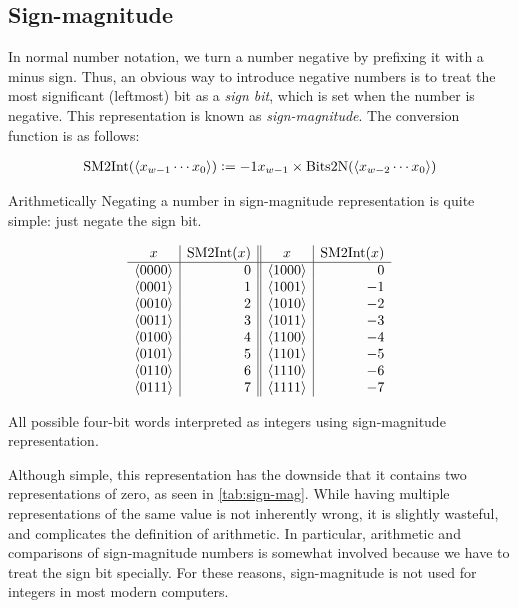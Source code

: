 \subsection{Sign-magnitude}
\label{sec:sign-magnitude}

In normal number notation, we turn a number negative by prefixing it
with a minus sign.  Thus, an obvious way to introduce negative numbers
is to treat the most significant (leftmost) bit as a \emph{sign bit},
which is set when the number is negative.  This representation is
known as \emph{sign-magnitude}.  The conversion function is as
follows:

\begin{definition}
\begin{align*}
  \mathrm{SM2Int}(\langle x_{w-1}\cdots x_{0} \rangle) \vcentcolon= -1x_{w-1} \times \mathrm{Bits2N}(\langle x_{w-2}\cdots x_{0} \rangle)
\end{align*}
\label{def:sm2int}
\end{definition}

Arithmetically Negating a number in sign-magnitude representation is
quite simple: just negate the sign bit.

\begin{table}
  \centering
  \[
  \begin{array}{c|r||c|r}
    x & \mathrm{SM2Int}(x) & x & \mathrm{SM2Int}(x) \\\hline
    \langle 0000 \rangle & 0 & \langle 1000 \rangle & 0 \\
    \langle 0001 \rangle & 1 & \langle 1001 \rangle & -1 \\
    \langle 0010 \rangle & 2 & \langle 1010 \rangle & -2 \\
    \langle 0011 \rangle & 3 & \langle 1011 \rangle & -3 \\
    \langle 0100 \rangle & 4 & \langle 1100 \rangle & -4 \\
    \langle 0101 \rangle & 5 & \langle 1101 \rangle & -5 \\
    \langle 0110 \rangle & 6 & \langle 1110 \rangle & -6 \\
    \langle 0111 \rangle & 7 & \langle 1111 \rangle & -7 \\
  \end{array}
  \]
  \caption{All possible four-bit words interpreted as integers using
    sign-magnitude representation.}
  \label{tab:sign-mag}
\end{table}

Although simple, this representation has the downside that it contains
two representations of zero, as seen in \cref{tab:sign-mag}.  While
having multiple representations of the same value is not inherently
wrong, it is slightly wasteful, and complicates the definition of
arithmetic.  In particular, arithmetic and comparisons of
sign-magnitude numbers is somewhat involved because we have to treat
the sign bit specially.  For these reasons, sign-magnitude is not used
for integers in most modern computers.

